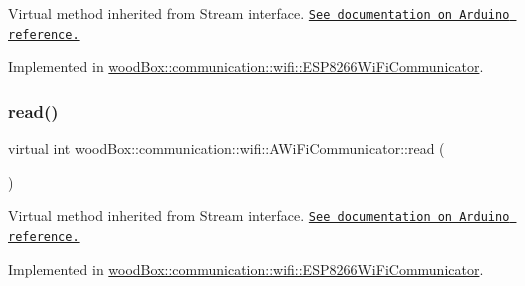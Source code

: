 Virtual method inherited from Stream interface. \href{https://www.arduino.cc/reference/en/language/functions/communication/stream/streampeek/}{\tt See documentation on Arduino reference.} 

Implemented in \mbox{\hyperlink{classwood_box_1_1communication_1_1wifi_1_1_e_s_p8266_wi_fi_communicator_accc6832fa7351cb977b9e3a805dc8107}{wood\+Box\+::communication\+::wifi\+::\+E\+S\+P8266\+Wi\+Fi\+Communicator}}.

\mbox{\label{classwood_box_1_1communication_1_1wifi_1_1_a_wi_fi_communicator_af4bc1adc96c124e769eb8c54d76476cf}} 
\subsubsection{\texorpdfstring{read()}{read()}}
{\footnotesize\ttfamily virtual int wood\+Box\+::communication\+::wifi\+::\+A\+Wi\+Fi\+Communicator\+::read (\begin{DoxyParamCaption}{ }\end{DoxyParamCaption})\hspace{0.3cm}{\ttfamily [pure virtual]}}

Virtual method inherited from Stream interface. \href{https://www.arduino.cc/reference/en/language/functions/communication/stream/streamread/}{\tt See documentation on Arduino reference.} 

Implemented in \mbox{\hyperlink{classwood_box_1_1communication_1_1wifi_1_1_e_s_p8266_wi_fi_communicator_a3bd1c8f72256e92c6dbdab9272fd3543}{wood\+Box\+::communication\+::wifi\+::\+E\+S\+P8266\+Wi\+Fi\+Communicator}}.

\mbox{\label{classwood_box_1_1communication_1_1wifi_1_1_a_wi_fi_communicator_a6987322a622fab72d4a01de99da19491}} 

